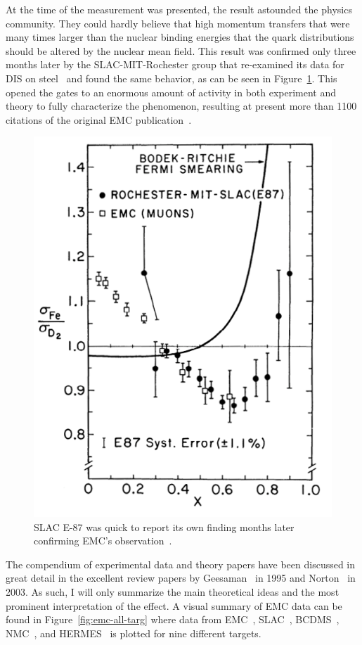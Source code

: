 At the time of the measurement was presented, the result astounded the physics community. They could hardly believe that high momentum transfers that were many times larger than the nuclear binding energies that the quark distributions should be altered by the nuclear mean field. This result was confirmed only three months later by the SLAC-MIT-Rochester group that re-examined its data for DIS on steel~\cite{PhysRevLett.50.1431} and found the same behavior, as can be seen in Figure~\ref{fig:emc-e87}. This opened the gates to an enormous amount of activity in both experiment and theory to fully characterize the phenomenon, resulting at present more than 1100 citations of the original EMC publication~\cite{Aubert:1983xm}. \setlength{\columnsep}{28pt} \begin{figure}
	\centering
	\includegraphics[height=0.35\textheight]{figures/background/SLAC-E87.png}
	\caption{SLAC E-87 was quick to report its own finding months later confirming EMC's observation~\cite{PhysRevLett.50.1431}.}
	\vspace{-20pt}
	\label{fig:emc-e87}
\end{figure} The compendium of experimental data and theory papers have been discussed in great detail in the excellent review papers by Geesaman~\cite{Geesaman:1995yd} in 1995 and Norton~\cite{norton:emc-review} in 2003. As such, I will only summarize the main theoretical ideas and the most prominent interpretation of the effect. A visual summary of EMC data can be found in Figure~\ref{fig:emc-all-targ} where data from EMC~\cite{Aubert:1983xm}, SLAC~\cite{Arnold:1983mw, Gomez:1993ri}, BCDMS~\cite{Benvenuti:1987az}, NMC~\cite{Amaudruz:1991nw}, and HERMES~\cite{Ackerstaff:1999ac} is plotted for nine different targets.

